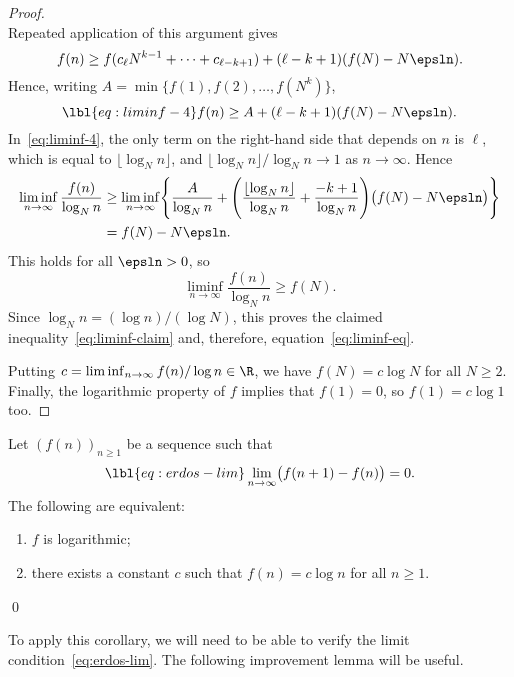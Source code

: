 \begin{proof}
\[\]
Repeated application of this argument gives
\[
f(n)    
\geq 
f(c_\ell N^{k - 1} + \cdots + c_{\ell - k + 1}) 
+ (\ell - k + 1)(f(N) - N\epsln).
\]
Hence, writing $A = \min\bigl\{f(1), f(2), \ldots, f(N^k)\bigr\}$, 
% 
\begin{equation}
\lbl{eq:liminf-4}
f(n) 
\geq
A + (\ell - k + 1)(f(N) - N\epsln).
\end{equation}
% 
In~\eqref{eq:liminf-4}, the only term on the right-hand side that depends
on $n$ is $\ell$, which is equal to $\lfloor \log_N n \rfloor$, and
$\lfloor \log_N n \rfloor/\log_N n \to 1$ as $n \to \infty$.  Hence
% 
\begin{align*}
\liminf_{n \to \infty} \frac{f(n)}{\log_N n}    &
\geq
\liminf_{n \to \infty} \Biggl\{
\frac{A}{\log_N n} + \Biggl( 
\frac{\lfloor \log_N n \rfloor}{\log_N n} + \frac{-k + 1}{\log_N n} 
\Biggr)\bigl(f(N) - N\epsln\bigr)
\Biggr\}        \\
&
=
f(N) - N\epsln.
\end{align*}
% 
This holds for all $\epsln > 0$, so 
\[
\liminf_{n \to \infty} \frac{f(n)}{\log_N n} 
\geq 
f(N).
\]
Since $\log_N n = (\log n)/(\log N)$, this proves the claimed
inequality~\eqref{eq:liminf-claim} and, therefore,
equation~\eqref{eq:liminf-eq}.

Putting $c = \liminf_{n \to \infty} f(n)/\log n \in \R$, we have $f(N) = c
\log N$ for all $N \geq 2$.  Finally, the logarithmic property of $f$
implies that $f(1) = 0$, so $f(1) = c \log 1$ too.
\end{proof}

\begin{cor}
Let $(f(n))_{n \geq 1}$ be a sequence such that
% 
\begin{equation}
\lbl{eq:erdos-lim}
\lim_{n \to \infty} \bigl( f(n + 1) - f(n) \bigr) = 0.
\end{equation}
% 
The following are equivalent:
% 
\begin{enumerate}
\item 
{}
$f$ is logarithmic;

\item
{}
there exists a constant $c$ such that $f(n) = c \log n$ for all $n \geq 1$.
\end{enumerate}
\qed
\end{cor}

To apply this corollary, we will need to be able to verify the limit
condition~\eqref{eq:erdos-lim}.  The following improvement lemma will be
useful.

